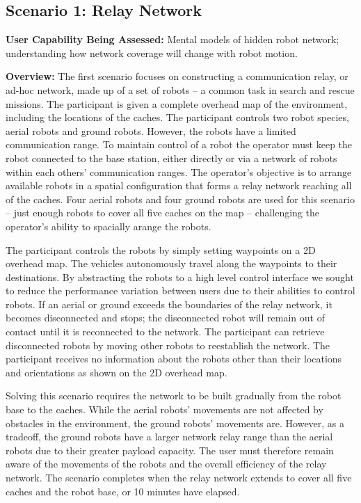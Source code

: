 \documentclass[letterpaper, 10 pt, conference]{ieeeconf}  %
\begin{document}
\subsection{Scenario 1: Relay Network}

\textbf{User Capability Being Assessed:} Mental models of hidden robot network; understanding how network coverage will change with robot motion.

\textbf{Overview:} The first scenario focuses on constructing a communication relay, or ad-hoc network, made up of a set of robots -- a common task in search and rescue missions. The participant is given a complete overhead map of the environment, including the locations of the caches. The participant controls two robot species, aerial robots and ground robots. However, the robots have a limited communication range.  To maintain control of a robot the operator must keep the robot connected to the base station, either directly or via a network of robots within each others' communication ranges. The operator's objective is to arrange available robots in a spatial configuration that forms a relay network reaching all of the caches.  Four aerial robots and four ground robots are used for this scenario -- just enough robots to cover all five caches on the map -- challenging the operator's ability to spacially arange the robots.

The participant controls the robots by simply setting waypoints on a 2D overhead map. The vehicles autonomously travel along the waypoints to their destinations. By abstracting the robots to a high level control interface we sought to reduce the performance variation between users due to their abilities to control robots. If an aerial or ground exceeds the boundaries of the relay network, it becomes disconnected and stops; the disconnected robot will remain out of contact until it is reconnected to the network. The participant can retrieve disconnected robots by moving other robots to reestablish the network. The participant receives no information about the robots other than their locations and orientations as shown on the 2D overhead map.

Solving this scenario requires the network to be built gradually from the robot base to the caches. While the aerial robots' movements are not affected by obstacles in the environment, the ground robots' movements are. However, as a tradeoff, the ground robots have a larger network relay range than the aerial robots due to their greater payload capacity. The user must therefore remain aware of the movements of the robots and the overall efficiency of the relay network. The scenario completes when the relay network extends to cover all five caches and the robot base, or 10 minutes have elapsed.
\end{document}
